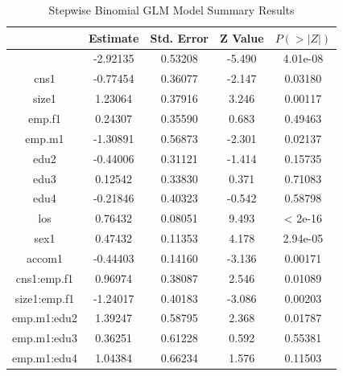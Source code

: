 \documentclass[11pt]{article}
\begin{document}
\begin{table}[ht]
    \centering
    \begin{tabular}{|c|cccc|}
        \hline
                     & Estimate    & Std. Error & Z Value & $P(>|Z|)$ \\
        \hline
                     & -2.92135    & 0.53208  & -5.490 & 4.01e-08 \\
        \hline
        cns1         & -0.77454    & 0.36077  & -2.147 &  0.03180 \\ 
        size1        &  1.23064    & 0.37916  &  3.246 &  0.00117 \\ 
        emp.f1       &  0.24307    & 0.35590  &  0.683 &  0.49463 \\   
        emp.m1       & -1.30891    & 0.56873  & -2.301 &  0.02137 \\ 
        edu2         & -0.44006    & 0.31121  & -1.414 &  0.15735 \\    
        edu3         &  0.12542    & 0.33830  &  0.371 &  0.71083 \\    
        edu4         & -0.21846    & 0.40323  & -0.542 &  0.58798 \\   
        los          &  0.76432    & 0.08051  &  9.493 &  < 2e-16 \\ 
        sex1         &  0.47432    & 0.11353  &  4.178 & 2.94e-05 \\ 
        accom1       & -0.44403    & 0.14160  & -3.136 &  0.00171 \\ 
        cns1:emp.f1  &  0.96974    & 0.38087  &  2.546 &  0.01089 \\
        size1:emp.f1 & -1.24017    & 0.40183  & -3.086 &  0.00203 \\ 
        emp.m1:edu2  &  1.39247    & 0.58795  &  2.368 &  0.01787 \\ 
        emp.m1:edu3  &  0.36251    & 0.61228  &  0.592 &  0.55381 \\    
        emp.m1:edu4  &  1.04384    & 0.66234  &  1.576 &  0.11503 \\ 
        \hline
    \end{tabular}
    \caption{Stepwise Binomial GLM Model Summary Results}
    \label{tab:stp-binom}
\end{table}
\end{document}
